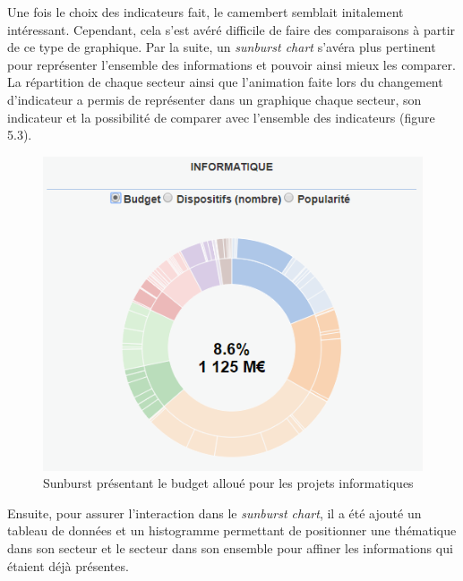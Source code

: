 Une fois le choix des indicateurs fait, le camembert semblait initalement intéressant. Cependant, cela s'est avéré difficile de faire des comparaisons à partir de ce type de graphique. Par la suite, un \textit{sunburst chart} s'avéra plus pertinent pour représenter l'ensemble des informations et pouvoir ainsi mieux les comparer. La répartition de chaque secteur ainsi que l'animation faite lors du changement d'indicateur a permis de représenter dans un graphique chaque secteur, son indicateur et la possibilité de comparer avec l'ensemble des indicateurs (figure 5.3).\\

\begin{figure}
\begin{center}
\includegraphics[scale=1]{resources/sunburst.png}
\caption{Sunburst présentant le budget alloué pour les projets informatiques}
\end{center}
\end{figure}

Ensuite, pour assurer l'interaction dans le \textit{sunburst chart}, il a été ajouté un tableau de données et un histogramme permettant de positionner une thématique dans son secteur et le secteur dans son ensemble pour affiner les informations qui étaient déjà présentes.